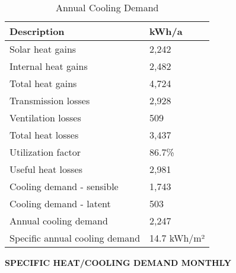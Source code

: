 \documentclass{article}
\begin{document}
\begin{table}[h!]
    \centering
    \caption{Annual Cooling Demand}
    \begin{tabular}{@{}ll@{}}
        \toprule
        \textbf{Description}         & \textbf{kWh/a} \\ \midrule
        Solar heat gains             & 2,242          \\
        Internal heat gains          & 2,482          \\
        Total heat gains             & 4,724          \\
        Transmission losses          & 2,928          \\
        Ventilation losses           & 509            \\
        Total heat losses            & 3,437          \\
        Utilization factor           & 86.7\%         \\
        Useful heat losses           & 2,981          \\ \midrule
        Cooling demand - sensible     & 1,743          \\
        Cooling demand - latent       & 503            \\
        Annual cooling demand         & 2,247          \\
        Specific annual cooling demand & 14.7 kWh/m²    \\ \bottomrule
    \end{tabular}
\end{table}


\begin{center}
    \textbf{SPECIFIC HEAT/COOLING DEMAND MONTHLY}
\end{center}
\end{document}
